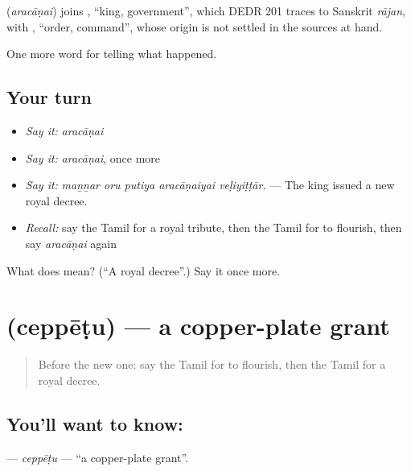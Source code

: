 \begin{cousinweb}
\textbf{} (\emph{aracāṇai}) joins , \textquotedblleft{}king, government\textquotedblright{}, which DEDR 201 traces to Sanskrit \emph{rājan}, with , \textquotedblleft{}order, command\textquotedblright{}, whose origin is not settled in the sources at hand.
\end{cousinweb}

\begin{grammarlens}[title={What you've built}]
One more word for telling what happened.
\end{grammarlens}

\subsection*{Your turn}
\begin{itemize}
\raggedright
  \item \emph{Say it:} \emph{aracāṇai}
  \item \emph{Say it:} \emph{aracāṇai}, once more
  \item \emph{Say it:} \emph{maṉṉar oru putiya aracāṇaiyai veḷiyiṭṭār.} — The king issued a new royal decree.
  \item \emph{Recall:} say the Tamil for a royal tribute, then the Tamil for to flourish, then say \emph{aracāṇai} again
\end{itemize}

\begin{tcolorbox}[breakable,colback=teal!4,colframe=teal!35!black,title={Before you move on}]
What does  mean? (\textquotedblleft{}A royal decree\textquotedblright{}.) Say it once more.
\end{tcolorbox}
\section[\texorpdfstring{\ta{செப்பேடு} (ceppēṭu)}{செப்பேடு (ceppēṭu)}]{ (ceppēṭu) — a copper-plate grant}

\label{lesson:TA-C331-ceppetu}



\begin{quote}
Before the new one: say the Tamil for to flourish, then the Tamil for a royal decree.
\end{quote}

\subsection*{You'll want to know: }
\textbf{} — \emph{ceppēṭu} — \textquotedblleft{}a copper-plate grant\textquotedblright{}.

